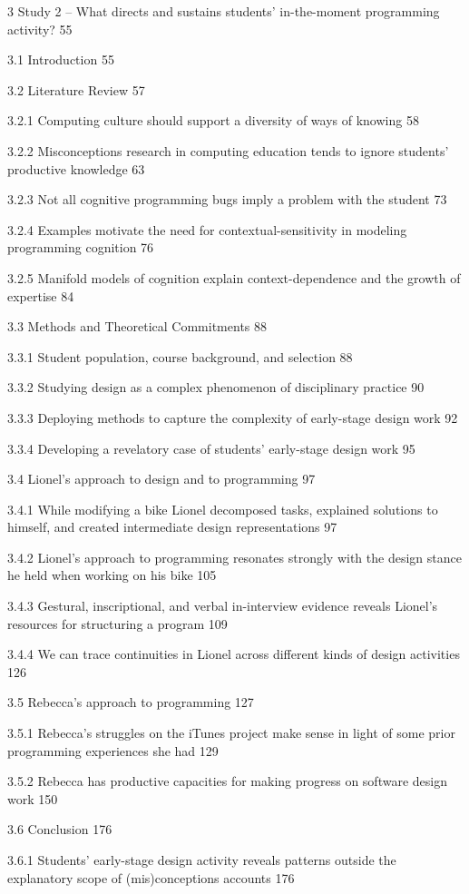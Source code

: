 3 Study 2 -- What directs and sustains students' in-the-moment
programming activity? 55

3.1 Introduction 55

3.2 Literature Review 57

3.2.1 Computing culture should support a diversity of ways of knowing 58

3.2.2 Misconceptions research in computing education tends to ignore
students' productive knowledge 63

3.2.3 Not all cognitive programming bugs imply a problem with the
student 73

3.2.4 Examples motivate the need for contextual-sensitivity in modeling
programming cognition 76

3.2.5 Manifold models of cognition explain context-dependence and the
growth of expertise 84

3.3 Methods and Theoretical Commitments 88

3.3.1 Student population, course background, and selection 88

3.3.2 Studying design as a complex phenomenon of disciplinary practice
90

3.3.3 Deploying methods to capture the complexity of early-stage design
work 92

3.3.4 Developing a revelatory case of students' early-stage design work
95

3.4 Lionel's approach to design and to programming 97

3.4.1 While modifying a bike Lionel decomposed tasks, explained
solutions to himself, and created intermediate design representations 97

3.4.2 Lionel's approach to programming resonates strongly with the
design stance he held when working on his bike 105

3.4.3 Gestural, inscriptional, and verbal in-interview evidence reveals
Lionel's resources for structuring a program 109

3.4.4 We can trace continuities in Lionel across different kinds of
design activities 126

3.5 Rebecca's approach to programming 127

3.5.1 Rebecca's struggles on the iTunes project make sense in light of
some prior programming experiences she had 129

3.5.2 Rebecca has productive capacities for making progress on software
design work 150

3.6 Conclusion 176

3.6.1 Students' early-stage design activity reveals patterns outside the
explanatory scope of (mis)conceptions accounts 176

